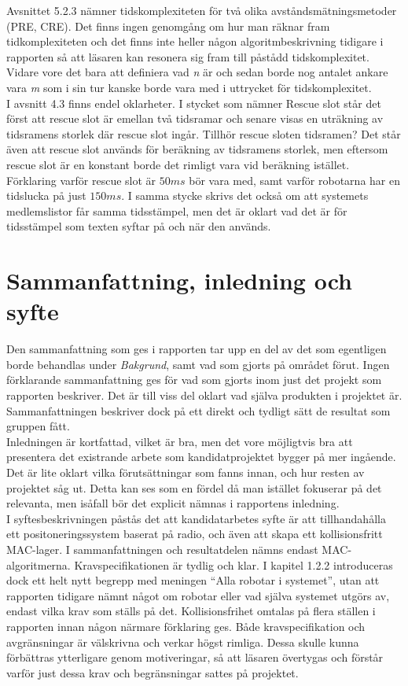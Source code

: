 \documentclass[a4paper,11pt]{article}
\begin{document}
Avsnittet 5.2.3 nämner tidskomplexiteten för två olika avståndsmätningsmetoder (PRE, CRE). Det finns ingen genomgång om hur man räknar fram tidkomplexiteten och det finns inte heller någon algoritmbeskrivning tidigare i rapporten så att läsaren kan resonera sig fram till påstådd tidskomplexitet. Vidare vore det bara att definiera vad \emph{n} är och sedan borde nog antalet ankare vara \emph{m} som i sin tur kanske borde vara med i uttrycket för tidskomplexitet. \\

I avsnitt 4.3 finns endel oklarheter. I stycket som nämner Rescue slot står det först att rescue slot är emellan två tidsramar och senare visas en uträkning av tidsramens storlek där rescue slot ingår. Tillhör rescue sloten tidsramen? Det står även att rescue slot används för beräkning av tidsramens storlek, men eftersom rescue slot är en konstant borde det rimligt vara vid beräkning istället. Förklaring varför rescue slot är $50 ms$ bör vara med, samt varför robotarna har en tidslucka på just $150 ms$. I samma stycke skrivs det också om att systemets medlemslistor får samma tidsstämpel, men det är oklart vad det är för tidsstämpel som texten syftar på och när den används.

\section{Sammanfattning, inledning och syfte}

Den sammanfattning som ges i rapporten tar upp en del av det som egentligen borde behandlas under \emph{Bakgrund}, samt vad som gjorts på området förut. Ingen förklarande sammanfattning ges för vad som gjorts inom just det projekt som rapporten beskriver. Det är till viss del oklart vad själva produkten i projektet är. Sammanfattningen beskriver dock på ett direkt och tydligt sätt de resultat som gruppen fått. \\

Inledningen är kortfattad, vilket är bra, men det vore möjligtvis bra att presentera det existrande arbete som kandidatprojektet bygger på mer ingående. Det är lite oklart vilka förutsättningar som fanns innan, och hur resten av projektet såg ut. Detta kan ses som en fördel då man istället fokuserar på det relevanta, men isåfall bör det explicit nämnas i rapportens inledning. \\

I syftesbeskrivningen påstås det att kandidatarbetes syfte är att tillhandahålla ett positoneringssystem baserat på radio, och även att skapa ett kollisionsfritt MAC-lager. I sammanfattningen och resultatdelen nämns endast MAC-algoritmerna. Kravspecifikationen är tydlig och klar. I kapitel 1.2.2 introduceras dock ett helt nytt begrepp med meningen “Alla robotar i systemet”, utan att rapporten tidigare nämnt något om robotar eller vad själva systemet utgörs av, endast vilka krav som ställs på det. Kollisionsfrihet omtalas på flera ställen i rapporten innan någon närmare förklaring ges. Både kravspecifikation och avgränsningar är välskrivna och verkar högst rimliga. Dessa skulle kunna förbättras ytterligare genom motiveringar, så att läsaren övertygas och förstår varför just dessa krav och begränsningar sattes på projektet. \\ 
\end{document}
